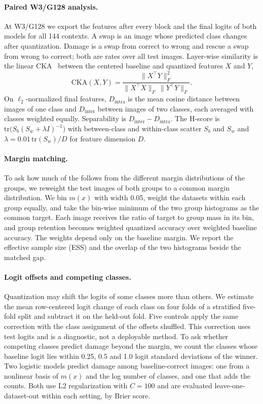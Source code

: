 \paragraph{Paired W3/G128 analysis.}
At W3/G128 we export the features after every block and the final logits of both models for all 144 contexts.
A swap is an image whose predicted class changes after quantization.
Damage is a swap from correct to wrong and rescue a swap from wrong to correct; both are rates over all test images.
Layer-wise similarity is the linear CKA~\cite{kornblith2019similarity} between the centered baseline and quantized features $X$ and $Y$,
\begin{equation}
  \mathrm{CKA}(X, Y) = \frac{\lVert X^{\top} Y \rVert_F^2}{\lVert X^{\top} X \rVert_F \, \lVert Y^{\top} Y \rVert_F}.
  \label{eq:cka}
\end{equation}
On $\ell_2$-normalized final features, $D_{\mathrm{intra}}$ is the mean cosine distance between images of one class and $D_{\mathrm{inter}}$ between images of two classes, each averaged with classes weighted equally.
Separability is $D_{\mathrm{inter}} - D_{\mathrm{intra}}$.
The H-score is $\mathrm{tr}\big(S_b (S_w + \lambda I)^{-1}\big)$ with between-class and within-class scatter $S_b$ and $S_w$ and $\lambda = 0.01\,\mathrm{tr}(S_w)/D$ for feature dimension $D$.

\paragraph{Margin matching.}
To ask how much of the  follows from the different margin distributions of the groups, we reweight the test images of both groups to a common margin distribution.
We bin $m(x)$ with width 0.05, weight the datasets within each group equally, and take the bin-wise minimum of the two group histograms as the common target.
Each image receives the ratio of target to group mass in its bin, and group retention becomes weighted quantized accuracy over weighted baseline accuracy.
The weights depend only on the baseline margin.
We report the effective sample size (ESS) and the overlap of the two histograms beside the matched gap.

\paragraph{Logit offsets and competing classes.}
Quantization may shift the logits of some classes more than others.
We estimate the mean row-centered logit change of each class on four folds of a stratified five-fold split and subtract it on the held-out fold.
Five controls apply the same correction with the class assignment of the offsets shuffled.
This correction uses test logits and is a diagnostic, not a deployable method.
To ask whether competing classes predict damage beyond the margin, we count the classes whose baseline logit lies within 0.25, 0.5 and 1.0 logit standard deviations of the winner.
Two logistic models predict damage among baseline-correct images: one from a nonlinear basis of $m(x)$ and the log number of classes, and one that adds the counts.
Both use L2 regularization with $C=100$ and are evaluated leave-one-dataset-out within each setting, by Brier score.
